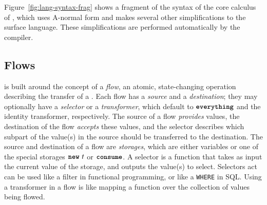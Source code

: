 \documentclass[dvipsnames, usenames, sigconf]{acmart}
\begin{document}
Figure~\ref{fig:lang-syntax-frag} shows a fragment of the syntax of the core calculus of \langName, which uses A-normal form and makes several other simplifications to the surface \langName language.
These simplifications are performed automatically by the compiler.

\subsection{Flows}
\langName is built around the concept of a \emph{flow}, an atomic, state-changing operation describing the transfer of a \assetTxt.
Each flow has a \emph{source} and a \emph{destination}; they may optionally have a \emph{selector} or a \emph{transformer}, which default to $\textbf{\texttt{everything}}$ and the identity transformer, respectively.
The source of a flow \emph{provides} values, the destination of the flow \emph{accepts} these values, and the selector describes which subpart of the value(s) in the source should be transferred to the destination.
The source and destination of a flow are \emph{storages}, which are either variables or one of the special storages $\textbf{\texttt{new}}~t$ or $\textbf{\texttt{consume}}$.
A selector is a function that takes as input the current value of the storage, and outputs the value(s) to select.
Selectors act can be used like a filter in functional programming, or like a \lstinline{WHERE} in SQL.
Using a transformer in a flow is like mapping a function over the collection of values being flowed.
\end{document}
